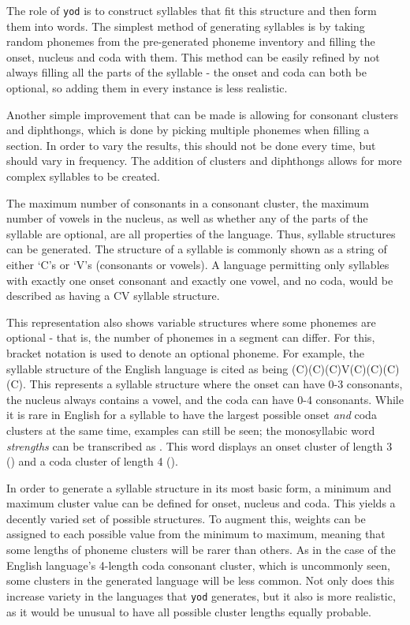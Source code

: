 \documentclass{report}
\begin{document}
	The role of \texttt{yod} is to construct syllables that fit this structure and then form them into words. The simplest method of generating syllables is by taking random phonemes from the pre-generated phoneme inventory and filling the onset, nucleus and coda with them. This method can be easily refined by not always filling all the parts of the syllable - the onset and coda can both be optional, so adding them in every instance is less realistic.
	
	Another simple improvement that can be made is allowing for consonant clusters and diphthongs, which is done by picking multiple phonemes when filling a section. In order to vary the results, this should not be done every time, but should vary in frequency. The addition of clusters and diphthongs allows for more complex syllables to be created.
	
	The maximum number of consonants in a consonant cluster, the maximum number of vowels in the nucleus, as well as whether any of the parts of the syllable are optional, are all properties of the language. Thus, syllable structures can be generated. The structure of a syllable is commonly shown as a string of either `C's or `V's (consonants or vowels)\cite{clements1985cv}. A language permitting only syllables with exactly one onset consonant and exactly one vowel, and no coda, would be described as having a CV syllable structure.
	
	This representation also shows variable structures where some phonemes are optional - that is, the number of phonemes in a segment can differ. For this, bracket notation is used to denote an optional phoneme. For example, the syllable structure of the English language is cited as being (C)(C)(C)V(C)(C)(C)(C). This represents a syllable structure where the onset can have 0-3 consonants, the nucleus always contains a vowel, and the coda can have 0-4 consonants. While it is rare in English for a syllable to have the largest possible onset \textit{and} coda clusters at the same time, examples can still be seen; the monosyllabic word \textit{strengths} can be transcribed as . This word displays an onset cluster of length 3 () and a coda cluster of length 4 ().
	
	In order to generate a syllable structure in its most basic form, a minimum and maximum cluster value can be defined for onset, nucleus and coda. This yields a decently varied set of possible structures. To augment this, weights can be assigned to each possible value from the minimum to maximum, meaning that some lengths of phoneme clusters will be rarer than others. As in the case of the English language's 4-length coda consonant cluster, which is uncommonly seen, some clusters in the generated language will be less common. Not only does this increase variety in the languages that \texttt{yod} generates, but it also is more realistic, as it would be unusual to have all possible cluster lengths equally probable.
	
\end{document}
